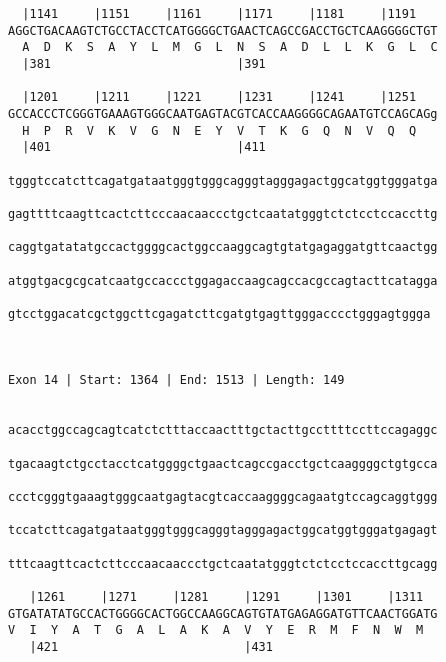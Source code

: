\documentclass{article}
\begin{document}
\begin{Verbatim}
  |1141     |1151     |1161     |1171     |1181     |1191   
AGGCTGACAAGTCTGCCTACCTCATGGGGCTGAACTCAGCCGACCTGCTCAAGGGGCTGT
  A  D  K  S  A  Y  L  M  G  L  N  S  A  D  L  L  K  G  L  C
  |381                          |391                        
  
  |1201     |1211     |1221     |1231     |1241     |1251   
GCCACCCTCGGGTGAAAGTGGGCAATGAGTACGTCACCAAGGGGCAGAATGTCCAGCAGg
  H  P  R  V  K  V  G  N  E  Y  V  T  K  G  Q  N  V  Q  Q   
  |401                          |411                        
  
tgggtccatcttcagatgataatgggtgggcagggtagggagactggcatggtgggatga
                                                            
gagttttcaagttcactcttcccaacaaccctgctcaatatgggtctctcctccaccttg
                                                            
caggtgatatatgccactggggcactggccaaggcagtgtatgagaggatgttcaactgg
                                                            
atggtgacgcgcatcaatgccaccctggagaccaagcagccacgccagtacttcatagga
                                                            
gtcctggacatcgctggcttcgagatcttcgatgtgagttgggacccctgggagtggga
                                                           
                                                           
 
Exon 14 | Start: 1364 | End: 1513 | Length: 149


acacctggccagcagtcatctctttaccaactttgctacttgccttttccttccagaggc
                                                            
tgacaagtctgcctacctcatggggctgaactcagccgacctgctcaaggggctgtgcca
                                                            
ccctcgggtgaaagtgggcaatgagtacgtcaccaaggggcagaatgtccagcaggtggg
                                                            
tccatcttcagatgataatgggtgggcagggtagggagactggcatggtgggatgagagt
                                                            
tttcaagttcactcttcccaacaaccctgctcaatatgggtctctcctccaccttgcagg
                                                            
   |1261     |1271     |1281     |1291     |1301     |1311  
GTGATATATGCCACTGGGGCACTGGCCAAGGCAGTGTATGAGAGGATGTTCAACTGGATG
V  I  Y  A  T  G  A  L  A  K  A  V  Y  E  R  M  F  N  W  M  
   |421                          |431                       
  

\end{Verbatim}
\end{document}
